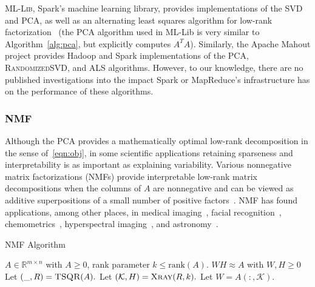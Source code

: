 \textsc{ML-Lib}, Spark's machine learning library, provides implementations of the SVD and PCA, as well as an alternating least squares algorithm for low-rank factorization~\cite{meng2015mllib} (the PCA algorithm used in ML-Lib is very similar to Algorithm~\ref{alg:pca}, but explicitly computes $A^TA$). Similarly, the Apache Mahout project provides Hadoop and Spark implementations of the PCA, \textsc{RandomizedSVD}, and ALS algorithms. However, to our knowledge, there are no published investigations into the impact Spark or MapReduce's infrastructure has on the performance of these algorithms.
  
\subsubsection{NMF}
Although the PCA provides a mathematically optimal low-rank decomposition in the sense of~\eqref{eqn:obj}, in some scientific applications retaining sparseness and interpretability is as important as explaining variability. 
Various nonnegative matrix factorizations (NMFs) provide interpretable low-rank matrix decompositions when the columns of $A$ are nonnegative and can be viewed as additive superpositions of a small number of positive factors~\cite{gillis2014and}. NMF has found applications, among other places, in medical imaging~\cite{lee2001nmf}, facial recognition~\cite{guillamet2002non}, chemometrics~\cite{Paatero199723}, hyperspectral imaging~\cite{gillis2015hierarchical}, and astronomy~\cite{pauca2006nonnegative}.

\begin{algorithm}[tb]
    \caption{\textsc{NMF} Algorithm}
    \label{alg:nmf}
    \begin{algorithmic}[1]
      \Require $A \in \mathbb{R}^{m\times n}$ with $A \geq 0$, rank parameter $k \leq \textrm{rank}(A).$
      \Ensure $W H \approx A$ with $W,H \geq 0$
      \State Let $(\_, R) = \textsc{TSQR}(A).$
      \State Let $(\mathcal{K}, H) = \textsc{Xray}(R, k).$
      \State Let $W = A(:, \mathcal{K}).$
    \end{algorithmic}
  \end{algorithm}
  

